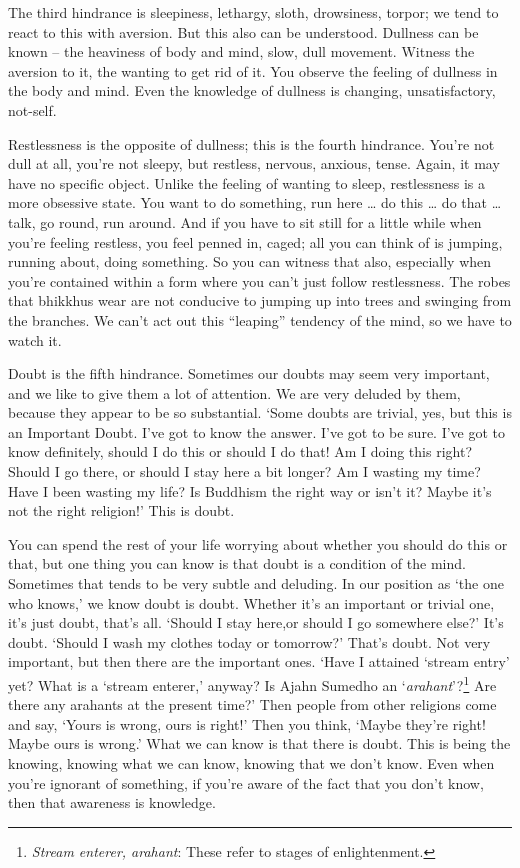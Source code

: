 The third hindrance is sleepiness, lethargy, sloth, drowsiness, torpor; we tend to react to this with aversion. But this also can be understood. Dullness can be known -- the heaviness of body and mind, slow, dull movement. Witness the aversion to it, the wanting to get rid of it. You observe the feeling of dullness in the body and mind. Even the knowledge of dullness is changing, unsatisfactory, not-self.

Restlessness is the opposite of dullness; this is the fourth hindrance. You're not dull at all, you're not sleepy, but restless, nervous, anxious, tense. Again, it may have no specific object. Unlike the feeling of wanting to sleep, restlessness is a more obsessive state. You want to do something, run here \ldots{} do this \ldots{} do that \ldots{} talk, go round, run around. And if you have to sit still for a little while when you're feeling restless, you feel penned in, caged; all you can think of is jumping, running about, doing something. So you can witness that also, especially when you're contained within a form where you can't just follow restlessness. The robes that bhikkhus wear are not conducive to jumping up into trees and swinging from the branches. We can't act out this ``leaping'' tendency of the mind, so we have to watch it.

Doubt is the fifth hindrance. Sometimes our doubts may seem very important, and we like to give them a lot of attention. We are very deluded by them, because they appear to be so substantial. `Some doubts are trivial, yes, but this is an Important Doubt. I've got to know the answer. I've got to be sure. I've got to know definitely, should I do this or should I do that! Am I doing this right? Should I go there, or should I stay here a bit longer? Am I wasting my time? Have I been wasting my life? Is Buddhism the right way or isn't it? Maybe it's not the right religion!' This is doubt.

You can spend the rest of your life worrying about whether you should do this or that, but one thing you can know is that doubt is a condition of the mind. Sometimes that tends to be very subtle and deluding. In our position as `the one who knows,' we know doubt is doubt. Whether it's an important or trivial one, it's just doubt, that's all. `Should I stay here,or should I go somewhere else?' It's doubt. `Should I wash my clothes today or tomorrow?' That's doubt. Not very important, but then there are the important ones. `Have I attained `stream entry' yet? What is a `stream enterer,' anyway? Is Ajahn Sumedho an `\textit{arahant}'?\footnote{\textit{Stream enterer, arahant}: These refer to stages of enlightenment.} Are there any arahants at the present time?' Then people from other religions come and say, `Yours is wrong, ours is right!' Then you think, `Maybe they're right! Maybe ours is wrong.' What we can know is that there is doubt. This is being the knowing, knowing what we can know, knowing that we don't know. Even when you're ignorant of something, if you're aware of the fact that you don't know, then that awareness is knowledge.

